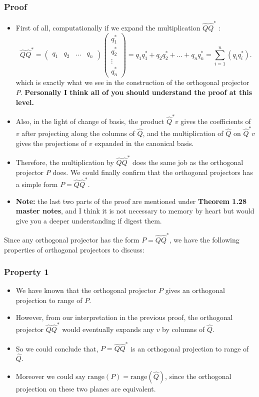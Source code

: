 \subsubsection*{Proof}%
\begin{itemize}
\item First of all, computationally if we expand the multiplication $\hat{Q}\hat{Q}^{*}$ :
  \[
    \hat{Q}\hat{Q}^* = \begin{pmatrix} q_1 & q_2 & \ldots & q_n \end{pmatrix} \begin{pmatrix} q_1^{*}\\ q_2^{*} \\\vdots\\ q_n^{*} \end{pmatrix} = q_1q_1^* + q_2q_2^* + \ldots + q_nq_n^{*} =  \sum_{i=1}^{n} (q_iq_i^{*})
  .\]
  which is exactly what we see in the construction of the orthogonal projector $P$. \textbf{Personally I think all of you should understand the proof at this level.}
\item Also, in the light of change of basis, the product $\hat{Q}^*v$ gives the coefficients of $v$ after projecting along the columns of  $\hat{Q}$, and the multiplication of $\hat{Q}$ on $\hat{Q}^*v$ gives the projections of $v$ expanded in the canonical basis. 
  \item Therefore, the multiplication by $\hat{Q}\hat{Q}^*$ does the same job as the orthogonal projector $P$ does. We could finally confirm that the orthogonal projectors has a simple form  $P  = \hat{Q}\hat{Q}^{*}$. 
  \item \textbf{Note:} the last two parts of the proof are mentioned under \textbf{Theorem 1.28 master notes}, and I think it is not necessary to memory by heart but would give you a deeper understanding if digest them.
\end{itemize}
Since any orthogonal projector has the form $P = \hat{Q}\hat{Q}^*$, we have the following properties of orthogonal projectors to discuss:
\subsubsection*{Property 1}%

\begin{itemize}
\item We have known that the orthogonal projector $P$ gives an orthogonal projection to range of $P$. 
\item However, from our interpretation in the previous proof, the orthogonal projector $\hat{Q}\hat{Q}^*$ would eventually expands any $v$ by columns of $\hat{Q}$. 
\item So we could conclude that, $P = \hat{Q}\hat{Q}^*$ is an orthogonal projection to range of $\hat{Q}$.
\item Moreover we could say $\text{range}(P) = \text{range}(\hat{Q})$, since the orthogonal projection on these two planes are equivalent.
\end{itemize}
